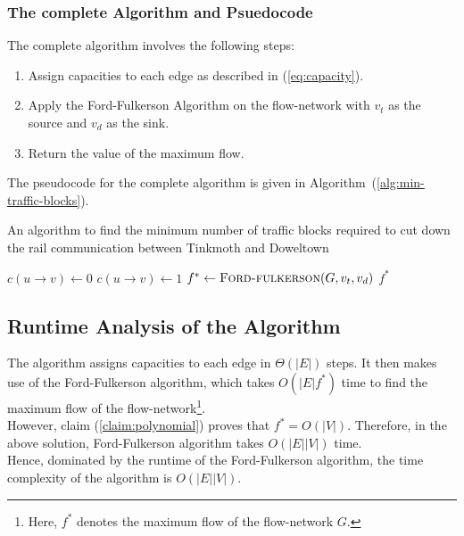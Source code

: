 \documentclass[12pt]{report}
\begin{document}
    \subsubsection*{The complete Algorithm and Psuedocode}
    The complete algorithm involves the following steps:
    \begin{enumerate}
        \item Assign capacities to each edge as described in (\ref{eq:capacity}).
        \item Apply the Ford-Fulkerson Algorithm on the flow-network with $v_{t}$ as the source and $v_{d}$ as the sink.
        \item Return the value of the maximum flow.
    \end{enumerate}
    The pseudocode for the complete algorithm is given in Algorithm~(\ref{alg:min-traffic-blocks}).

    \begin{algorithm}[H]
        \caption{An algorithm to find the minimum number of traffic blocks required to cut down the rail communication between Tinkmoth and Doweltown}
        \label{alg:min-traffic-blocks}
        \begin{algorithmic}[1]
                    \State $c(u \to v) \gets 0$
                \Else
                    \State $c(u \to v) \gets 1$
                \EndIf
            \EndFor
            \State $f^{*} \gets \Call{Ford-fulkerson}{G, v_{t}, v_{d}}$
            \State \Return $f^{*}$
            \EndProcedure
        \end{algorithmic}
    \end{algorithm}
    \vfill

    \subsection*{Runtime Analysis of the Algorithm}
    The algorithm assigns capacities to each edge in $\Theta(|E|)$ steps.
    It then makes use of the Ford-Fulkerson algorithm, which takes $O(|E| f^{*})$ time to find the maximum flow of the flow-network\footnote{
        Here, $f^{*}$ denotes the maximum flow of the flow-network $G$.
    }. \\
    However, claim (\ref{claim:polynomial}) proves that $f^{*} = O(|V|)$.
    Therefore, in the above solution, Ford-Fulkerson algorithm takes $O(|E||V|)$ time.
    \vspace*{10pt} \\
    Hence, dominated by the runtime of the Ford-Fulkerson algorithm, the time complexity of the algorithm is $O(|E||V|)$.
\end{document}
